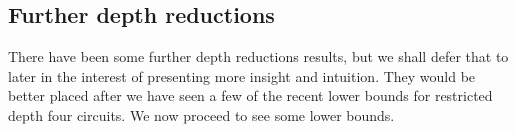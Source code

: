 \subsection*{Further depth reductions}

There have been some further depth reductions results, but we shall defer that to later in the interest of presenting more insight and intuition. They would be better placed after we have seen a few of the recent lower bounds for restricted depth four circuits. We now proceed to see some lower bounds. 




